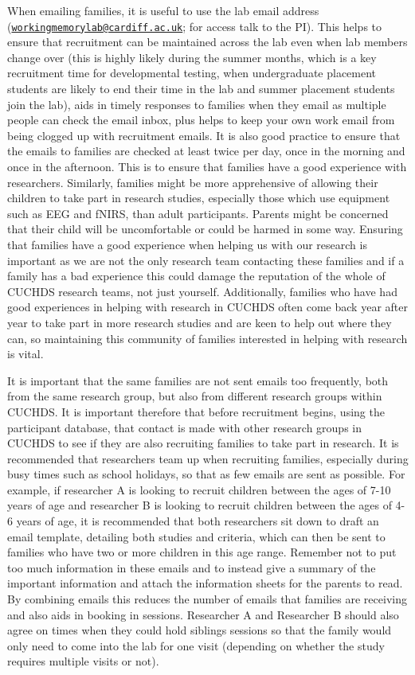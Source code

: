 \documentclass[
  12pt,
]{book}
\begin{document}
When emailing families, it is useful to use the lab email address (\href{mailto:workingmemorylab@cardiff.ac.uk}{\nolinkurl{workingmemorylab@cardiff.ac.uk}}; for access talk to the PI). This helps to ensure that recruitment can be maintained across the lab even when lab members change over (this is highly likely during the summer months, which is a key recruitment time for developmental testing, when undergraduate placement students are likely to end their time in the lab and summer placement students join the lab), aids in timely responses to families when they email as multiple people can check the email inbox, plus helps to keep your own work email from being clogged up with recruitment emails. It is also good practice to ensure that the emails to families are checked at least twice per day, once in the morning and once in the afternoon. This is to ensure that families have a good experience with researchers. Similarly, families might be more apprehensive of allowing their children to take part in research studies, especially those which use equipment such as EEG and fNIRS, than adult participants. Parents might be concerned that their child will be uncomfortable or could be harmed in some way. Ensuring that families have a good experience when helping us with our research is important as we are not the only research team contacting these families and if a family has a bad experience this could damage the reputation of the whole of CUCHDS research teams, not just yourself. Additionally, families who have had good experiences in helping with research in CUCHDS often come back year after year to take part in more research studies and are keen to help out where they can, so maintaining this community of families interested in helping with research is vital.

It is important that the same families are not sent emails too frequently, both from the same research group, but also from different research groups within CUCHDS. It is important therefore that before recruitment begins, using the participant database, that contact is made with other research groups in CUCHDS to see if they are also recruiting families to take part in research. It is recommended that researchers team up when recruiting families, especially during busy times such as school holidays, so that as few emails are sent as possible. For example, if researcher A is looking to recruit children between the ages of 7-10 years of age and researcher B is looking to recruit children between the ages of 4-6 years of age, it is recommended that both researchers sit down to draft an email template, detailing both studies and criteria, which can then be sent to families who have two or more children in this age range. Remember not to put too much information in these emails and to instead give a summary of the important information and attach the information sheets for the parents to read. By combining emails this reduces the number of emails that families are receiving and also aids in booking in sessions. Researcher A and Researcher B should also agree on times when they could hold siblings sessions so that the family would only need to come into the lab for one visit (depending on whether the study requires multiple visits or not).
\end{document}
